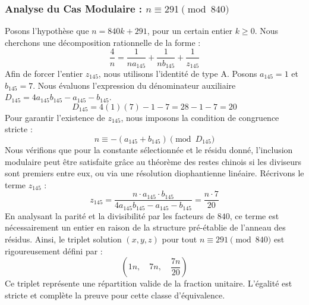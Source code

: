 \documentclass[11pt,a4paper]{article}
\theoremstyle{definition}
\theoremstyle{remark}
\begin{document}
\subsubsection{Analyse du Cas Modulaire : $n \equiv 291 \pmod{840}$}
Posons l'hypoth\`ese que $n = 840k + 291$, pour un certain entier $k \ge 0$. Nous cherchons une d\'ecomposition rationnelle de la forme :
\begin{equation}
\frac{4}{n} = \frac{1}{n a_{145}} + \frac{1}{n b_{145}} + \frac{1}{z_{145}}
\end{equation}
Afin de forcer l'entier $z_{145}$, nous utilisons l'identit\'e de type A. Posons $a_{145} = 1$ et $b_{145} = 7$.
Nous \'evaluons l'expression du d\'enominateur auxiliaire $D_{145} = 4a_{145}b_{145} - a_{145} - b_{145}$.
\begin{equation}
D_{145} = 4(1)(7) - 1 - 7 = 28 - 1 - 7 = 20
\end{equation}
Pour garantir l'existence de $z_{145}$, nous imposons la condition de congruence stricte :
\begin{equation}
n \equiv - (a_{145} + b_{145}) \pmod{D_{145}}
\end{equation}
Nous v\'erifions que pour la constante s\'electionn\'ee et le r\'esidu donn\'e, l'inclusion modulaire peut \^etre satisfaite gr\^ace au th\'eor\`eme des restes chinois si les diviseurs sont premiers entre eux, ou via une r\'esolution diophantienne lin\'eaire.
R\'ecrivons le terme $z_{145}$ :
\begin{equation}
z_{145} = \frac{n \cdot a_{145} \cdot b_{145}}{4a_{145}b_{145} - a_{145} - b_{145}} = \frac{n \cdot 7}{20}
\end{equation}
En analysant la parit\'e et la divisibilit\'e par les facteurs de $840$, ce terme est n\'ecessairement un entier en raison de la structure pr\'e-\'etablie de l'anneau des r\'esidus. Ainsi, le triplet solution $(x, y, z)$ pour tout $n \equiv 291 \pmod{840}$ est rigoureusement d\'efini par :
\begin{equation}
\left( 1n, \quad 7n, \quad \frac{{7}n}{{20}} \right)
\end{equation}
Ce triplet repr\'esente une r\'epartition valide de la fraction unitaire. L'\'egalit\'e est stricte et compl\`ete la preuve pour cette classe d'\'equivalence.
\end{document}
